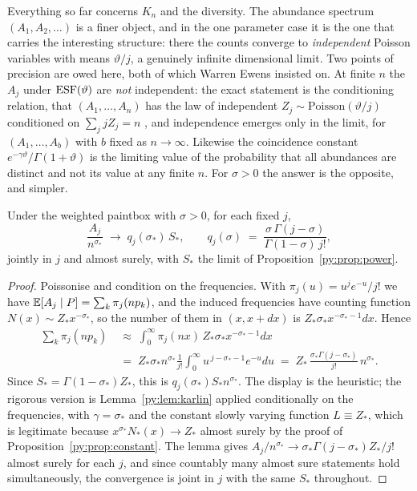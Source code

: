 Everything so far concerns $K_n$ and the diversity. The abundance spectrum $(A_1,A_2,\dots)$ is a
finer object, and in the one parameter case it is the one that carries the interesting structure:
there the counts converge to \emph{independent} Poisson variables with means $\vartheta/j$, a
genuinely infinite dimensional limit. Two points of precision are owed here, both of which Warren
Ewens insisted on. At finite $n$ the $A_j$ under $\mathrm{ESF}(\vartheta)$ are \emph{not} independent: the
exact statement is the conditioning relation, that $(A_1,\dots,A_n)$ has the law of independent
$Z_j \sim \mathrm{Poisson}(\vartheta/j)$ conditioned on $\sum_j jZ_j = n$
\citep{py:arratia2003}, and independence emerges only in the limit, for
$(A_1,\dots,A_b)$ with $b$ fixed as $n \to \infty$. Likewise the coincidence constant
$e^{-\gamma\vartheta}/\Gamma(1+\vartheta)$ is the limiting value of the probability that all
abundances are distinct and not its value at any finite $n$. For $\sigma > 0$ the answer is the
opposite, and simpler.

\begin{proposition}
\label{py:prop:joint}
Under the weighted paintbox with $\sigma > 0$, for each fixed $j$,
\begin{equation}
\frac{A_j}{n^{\sigma_*}} \;\longrightarrow\; q_j(\sigma_*)\,S_* ,
\qquad
q_j(\sigma) \;=\; \frac{\sigma\,\Gamma(j-\sigma)}{\Gamma(1-\sigma)\,j!},
\label{py:eq:joint}
\end{equation}
jointly in $j$ and almost surely, with $S_*$ the limit of Proposition~\ref{py:prop:power}.
\end{proposition}

\begin{proof}
Poissonise and condition on the frequencies. With $\pi_j(u) = u^{j}e^{-u}/j!$ we have
$\mathbb{E}[A_j \mid P] = \sum_k \pi_j(np_k)$, and the induced frequencies have counting function
$N(x) \sim Z_* x^{-\sigma_*}$, so the number of them in $(x,x+dx)$ is
$Z_*\sigma_* x^{-\sigma_*-1}dx$. Hence
\[
\begin{aligned}
\sum_k \pi_j(np_k) &\;\approx\; \int_0^\infty \pi_j(nx)\,Z_*\sigma_* x^{-\sigma_*-1}dx\\
&\;=\; Z_*\sigma_* n^{\sigma_*}\frac{1}{j!}\int_0^\infty u^{\,j-\sigma_*-1}e^{-u}du
\;=\; Z_*\,\frac{\sigma_*\Gamma(j-\sigma_*)}{j!}\,n^{\sigma_*} .
\end{aligned}
\]
Since $S_* = \Gamma(1-\sigma_*)Z_*$, this is $q_j(\sigma_*)S_*n^{\sigma_*}$. The display is the
heuristic; the rigorous version is Lemma~\ref{py:lem:karlin} applied conditionally on the
frequencies, with $\gamma = \sigma_*$ and the constant slowly varying function $L \equiv Z_*$, which
is legitimate because $x^{\sigma_*}N_*(x) \to Z_*$ almost surely by the proof of
Proposition~\ref{py:prop:constant}. The lemma gives $A_j/n^{\sigma_*} \to \sigma_*\Gamma(j-\sigma_*)Z_*/j!$
almost surely for each $j$, and since countably many almost sure statements hold simultaneously,
the convergence is joint in $j$ with the same $S_*$ throughout.
\end{proof}

